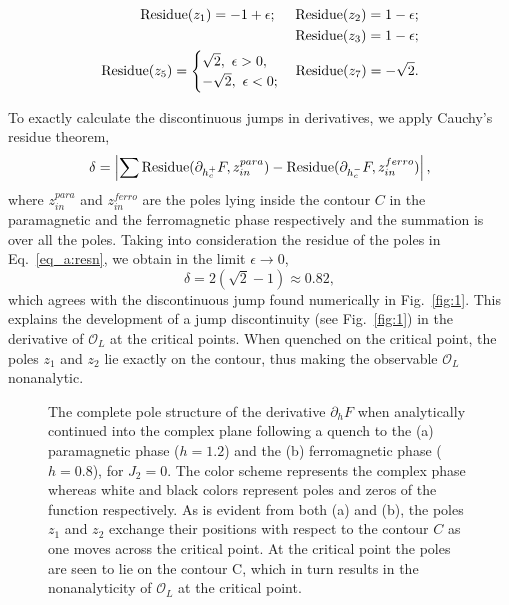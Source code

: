 \documentclass[aps,prx,twocolumn]{revtex4-2}
\begin{document}
{{\begin{widetext}
	\begin{eqnarray}\label{eq_a:resn}
		\nonumber		{\rm Residue}(z_1)= -1+\epsilon;~~~~
		\nonumber		{\rm Residue}(z_2)= 1-\epsilon;\\
		\nonumber		{\rm Residue}(z_3)= 1-\epsilon;\\
				{\rm Residue}(z_5)=
		\begin{cases}
			\sqrt{2}, ~\epsilon>0,\\
			-\sqrt{2}, ~\epsilon<0;\\
		\end{cases}
	{\rm Residue}(z_7)= -\sqrt{2}.
	\end{eqnarray}
\end{widetext}
To exactly calculate the discontinuous jumps in derivatives, we apply Cauchy's residue theorem,
\begin{equation}\label{eq_a:leresidue1}
	\delta=\left|\sum {\rm Residue}(\partial_{h_c^+}F,z_{in}^{para})-{\rm Residue}(\partial_{h_c^-}F,z_{in}^{ferro})\right|,
\end{equation}
where $z_{in}^{para}$ and $z_{in}^{ferro}$ are the poles lying inside the contour $C$ in the paramagnetic and the ferromagnetic phase respectively and the summation is over all the poles. Taking into consideration the residue of the poles in Eq.~\eqref{eq_a:resn}, we obtain in the limit $\epsilon\rightarrow 0$,
\begin{equation}
	\delta=2\left(\sqrt{2}-1\right)\approx 0.82,
\end{equation}
which agrees with the discontinuous jump found numerically in Fig.~\ref{fig:1}. This explains the development of a jump discontinuity (see Fig.~\ref{fig:1}) in the derivative of $\mathcal{O}_L$ at the critical points. When quenched on the critical point, the poles $z_1$ and $z_2$ lie exactly on the contour, thus making the observable $\mathcal{O}_L$ nonanalytic.\\
\begin{figure*}
	\caption{The complete pole structure of the derivative $\partial_hF$ when analytically continued into the complex plane following a quench to the (a) paramagnetic phase ($h=1.2$) and the (b) ferromagnetic phase ($h=0.8$), for $J_2=0$. The color scheme represents the complex phase whereas white and black colors represent poles and zeros of the function respectively.  As is evident from both (a) and (b), the poles $z_1$ and $z_2$ exchange their positions with respect to the contour $C$ as one moves across the critical point. At the critical point the poles are seen to lie on the contour C, which in turn results in the nonanalyticity of $\mathcal{O}_L$ at the critical point.}
	\label{figA:contourcover}
\end{figure*}

}}
\end{document}
